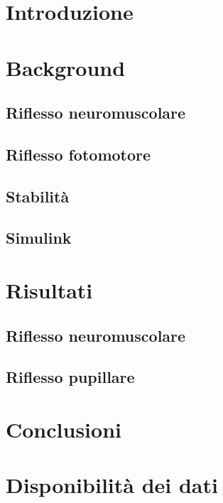 \section{Introduzione}

\textcolor{blue}{\lipsum[1-2]}

\section{Background}
\textcolor{blue}{}

\subsection{Riflesso neuromuscolare}

\subsection{Riflesso fotomotore}

\subsection{Stabilità}

\subsection{Simulink}

\section{Risultati}
\textcolor{blue}{\lipsum[1-5]}


\subsection{Riflesso neuromuscolare}

\subsection{Riflesso pupillare}

\section{Conclusioni}

\textcolor{blue}{\lipsum[1-2]}
\raggedbottom
\pagebreak
\section*{Disponibilità dei dati}


